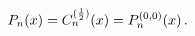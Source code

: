 \[\mathop{P_{n}\/}\nolimits\!\left(x\right)=\mathop{C^{(\frac{1}{2})}_{n}\/}%
\nolimits\!\left(x\right)=\mathop{P^{(0,0)}_{n}\/}\nolimits\!\left(x\right).\]